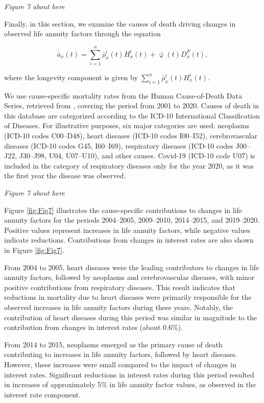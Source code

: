 \documentclass[12pt]{article}
\begin{document}
\begin{center}
	\textit{Figure 7 about here}
\end{center}
Finally, in this section, we examine the causes of death driving changes in observed life annuity factors through the equation 

\[
\acute{\bar{a}}_x(t) = \sum_{i=1}^{n} \bar{\rho}^i_x(t) {H}^i_x(t) + \bar{\upvarphi}(t) {D}^P_x(t),
\]

where the longevity component is given by \( \sum_{i=1}^{n} \bar{\rho}^i_x(t) {H}^i_x(t) \).

We use cause-specific mortality rates from the Human Cause-of-Death Data Series, retrieved from \citep{HCD2024}, covering the period from 2001 to 2020. Causes of death in this database are categorized according to the ICD-10 International Classification of Diseases. For illustrative purposes, six major categories are used: neoplasms (ICD-10 codes C00–D48), heart diseases (ICD-10 codes I00–I52), cerebrovascular diseases (ICD-10 codes G45, I60–I69), respiratory diseases (ICD-10 codes J00–J22, J30–J98, U04, U07–U10), and other causes. Covid-19 (ICD-10 code U07) is included in the category of respiratory diseases only for the year 2020, as it was the first year the disease was observed.

\begin{center}
	\textit{Figure 7 about here}
\end{center}

Figure \ref{fig:Fig7} illustrates the cause-specific contributions to changes in life annuity factors for the periods 2004–2005, 2009–2010, 2014–2015, and 2019–2020. Positive values represent increases in life annuity factors, while negative values indicate reductions. Contributions from changes in interest rates are also shown in Figure \ref{fig:Fig7}.

From 2004 to 2005, heart diseases were the leading contributors to changes in life annuity factors, followed by neoplasms and cerebrovascular diseases, with minor positive contributions from respiratory diseases. This result indicates that reductions in mortality due to heart diseases were primarily responsible for the observed increases in life annuity factors during these years. Notably, the contribution of heart diseases during this period was similar in magnitude to the contribution from changes in interest rates (about 0.6\%).

From 2014 to 2015, neoplasms emerged as the primary cause of death contributing to increases in life annuity factors, followed by heart diseases. However, these increases were small compared to the impact of changes in interest rates. Significant reductions in interest rates during this period resulted in increases of approximately 5\% in life annuity factor values, as observed in the interest rate component.
\end{document}
